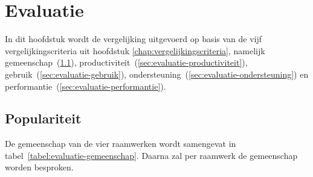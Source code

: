 \chapter{Evaluatie}
\label{chap:evaluatie}

In dit hoofdstuk wordt de vergelijking uitgevoerd op basis van de vijf vergelijkingscriteria uit hoofdstuk \ref{chap:vergelijkingscriteria}, namelijk gemeenschap~(\ref{sec:evaluatie-gemeenschap}), productiviteit~(\ref{sec:evaluatie-productiviteit}), gebruik~(\ref{sec:evaluatie-gebruik}), ondersteuning~(\ref{sec:evaluatie-ondersteuning}) en performantie~(\ref{sec:evaluatie-performantie}). 


\section{Populariteit} %
\label{sec:evaluatie-gemeenschap}

De gemeenschap van de vier raamwerken wordt samengevat in tabel~\ref{tabel:evaluatie-gemeenschap}. 
Daarna zal per raamwerk de gemeenschap worden besproken.

\begin{table}[H]
\centering
{}
\caption{Samenvattende tabel voor gemeenschapscriterium}
\label{tabel:evaluatie-gemeenschap}
\end{table}


 

